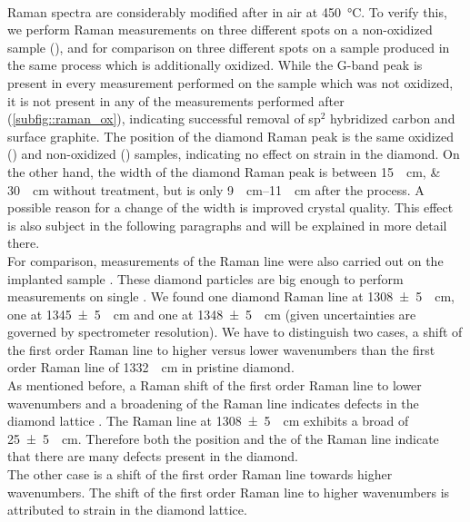 		\\
		\Nd Raman spectra are considerably modified after \ox in air at \SI{450}{\degreeCelsius}.
		To verify this, we perform Raman measurements on three different spots on a non-oxidized sample (\insituS), and for comparison on three different spots on a sample produced in the same process which is additionally oxidized.
		While the G-band peak is present in every measurement performed on the sample which was not oxidized, it is not present in any of the measurements performed after \ox (\autoref{subfig::raman_ox}), indicating successful removal of sp$^2$ hybridized carbon and surface graphite.
		The position of the diamond Raman peak is the same oxidized (\insituSo) and non-oxidized (\insituSn) samples, indicating no effect on strain in the diamond.
		On the other hand, the width of the diamond Raman peak is between \SIlist{15; 30}{\per\centi\meter} without \ox treatment, but is only \SIrange{9}{11}{\per\centi\meter} after the \ox process.
		A possible reason for a change of the width is improved crystal quality.
		This effect is also subject in the following paragraphs and will be explained in more detail there.
		\\
		For comparison, measurements of the Raman line were also carried out on the implanted sample \implantedTao. 
		These diamond particles are big enough to perform measurements on single \nds.
		We found one diamond Raman line at \SI[separate-uncertainty]{1308+-5}{\per\centi\meter}, one at \SI[separate-uncertainty]{1345+-5}{\per\centi\meter} and one at \SI[separate-uncertainty]{1348+-5}{\per\centi\meter} (given uncertainties are governed by spectrometer resolution).
		We have to distinguish two cases, a shift of the first order Raman line to higher versus lower wavenumbers than the first order Raman line of \SI{1332}{\per\centi\meter} in pristine diamond.
		\\
		As mentioned before, a Raman shift of the first order Raman line to lower wavenumbers and a broadening of the Raman line indicates defects in the diamond lattice \cite{Prawer2004}.
		The Raman line at \SI[separate-uncertainty]{1308+-5}{\per\centi\meter} exhibits a broad \lw of \SI[separate-uncertainty]{25+-5}{\per\centi\meter}.
		Therefore both the position and the \lw of the Raman line indicate that there are many defects present in the diamond.
		\\
		The other case is a shift of the first order Raman line towards higher wavenumbers.
		The shift of the first order Raman line to higher wavenumbers is attributed to strain in the diamond lattice.
